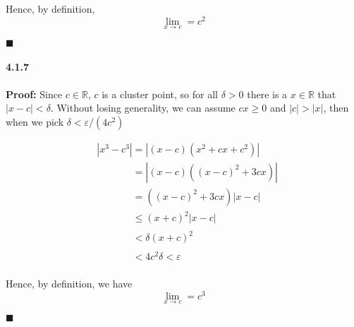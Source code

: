 \documentclass[11pt]{article}
\newcommand{\qed}{
	\begin{flushright}
		$\blacksquare$
	\end{flushright}}
\begin{document}
		Hence, by definition, 
		\[\lim_{x \rightarrow c} = c^2\]
		\qed
		
	\paragraph{4.1.7}\textbf{Proof:}
		Since $c \in \mathbb{R}$, $c$ is a cluster point, so for all $\delta > 0$ there is a $x \in \mathbb{R}$ that $|x - c| < \delta$. Without losing generality, we can assume $cx \geq 0$ and $|c| > |x|$, then when we pick $\delta < \varepsilon / (4c^2)$
		
		\begin{align}
			&|x^3 - c^3| = |(x - c)(x^2 + cx + c^2)|\nonumber\\
			&\phantom{|x^3 - c^3|} = |(x - c)((x - c)^2 + 3cx)|\nonumber\\
			&\phantom{|x^3 - c^3|} = ((x - c)^2 + 3cx)|x - c|\nonumber\\
			&\phantom{|x^3 - c^3|} \leq (x + c)^2|x - c|\nonumber\\
			&\phantom{|x^3 - c^3|} < \delta(x + c)^2 \nonumber\\
			&\phantom{|x^3 - c^3|} < 4c^2\delta < \varepsilon \nonumber
		\end{align}
		
		Hence, by definition, we have
		\[\lim_{x \rightarrow c} =c^3\]
		\qed
\end{document}
